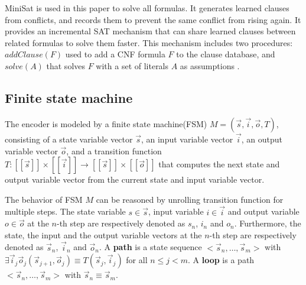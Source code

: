 \documentclass[runningheads,a4paper]{llncs}
\begin{document}
MiniSat \cite{EXTSAT} is used in this paper to solve all formulas.
It generates learned clauses from conflicts,
and records them to prevent the same conflict from rising again.
It provides an incremental SAT mechanism that can share learned clauses between related formulas
to solve them faster.
This mechanism includes two procedures:
$addClause(F)$ used to add a CNF formula $F$ to the clause database, and
$solve(A)$ that solves $F$ with a set of literals $A$ as assumptions
.


\subsection{Finite state machine}


The encoder is modeled by a finite state machine(FSM) $M=(\vec{s},\vec{i},\vec{o},T)$,
consisting of a state variable vector $\vec{s}$,
an input variable vector $\vec{i}$,
an output variable vector $\vec{o}$,
and a transition function $T: [\![\vec{s}]\!]\times [\![\vec{i}]\!]\to [\![\vec{s}]\!]\times [\![\vec{o}]\!]$ 
that computes the next state and output variable vector from the current state and input variable vector.

The behavior of FSM $M$ can be reasoned by unrolling transition function for multiple steps.
The state variable $s\in\vec{s}$, input variable $i\in\vec{i}$ and output variable $o\in\vec{o}$ at the $n$-th step 
are respectively denoted as $s_n$, $i_n$ and $o_n$.
Furthermore,
the state, the input and the output variable vectors at the $n$-th step are respectively denoted as $\vec{s}_n$, $\vec{i}_n$ and $\vec{o}_n$.
A \textbf{path} is a state sequence $<\vec{s}_n,\dots,\vec{s}_m>$ with $\exists \vec{i}_j\vec{o}_j (\vec{s}_{j+1},\vec{o}_j)\equiv T(\vec{s}_j,\vec{i}_j)$ for all $n\le j< m$.
A \textbf{loop} is a path $<\vec{s}_n,\dots,\vec{s}_m>$ with $\vec{s}_n\equiv \vec{s}_m$.
\end{document}
